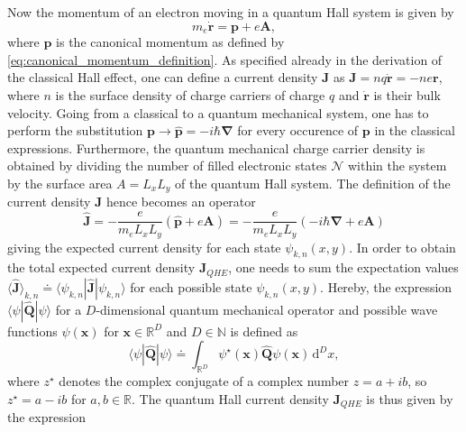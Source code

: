 \documentclass{report}
\numberwithin{tm}{section}
\newcommand\vect[1]{\ensuremath{\bm{#1}}}
\begin{document}
Now the momentum of an electron moving in a quantum Hall system is given by \begin{equation}
	m_e\dot{\vect{r}} = \vect{p} + e\vect{A},
\end{equation} where $\vect{p}$ is the canonical momentum as defined by \cref{eq:canonical_momentum_definition}. As specified already in the derivation of the classical Hall effect, one can define a current density $\vect{J}$ as $\vect{J} = nq\dot{\vect{r}} = -ne\vect{r}$, where $n$ is the surface density of charge carriers of charge $q$ and $\dot{\vect{r}}$ is their bulk velocity. Going from a classical to a quantum mechanical system, one has to perform the substitution $\vect{p} \rightarrow \hat{\vect{p}} = -i\hbar\vect{\nabla}$ for every occurence of $\vect{p}$ in the classical expressions. Furthermore, the quantum mechanical charge carrier density is obtained by dividing the number of filled electronic states $\mathcal{N}$ within the system by the surface area $A=L_xL_y$ of the quantum Hall system. The definition of the current density $\vect{J}$ hence becomes an operator \begin{equation}
\hat{\vect{J}} = -\frac{e}{m_eL_x L_y}\left(\hat{\vect{p}} + e\vect{A}\right) = -\frac{e}{m_eL_x L_y}\left(-i\hbar\vect{\nabla} + e\vect{A}\right)
\end{equation} giving the expected current density for each state $\psi_{k,n}(x,y)$. In order to obtain the total expected current density $\vect{J}_{QHE}$, one needs to sum the expectation values $\langle \hat{\vect{J}}\rangle_{k,n}\doteq \langle \psi_{k,n}|\hat{\vect{J}}|\psi_{k,n}\rangle$ for each possible state $\psi_{k,n}(x,y)$. Hereby, the expression $\langle \psi|\hat{\vect{Q}}|\psi\rangle$ for a $D$-dimensional quantum mechanical operator and possible wave functions $\psi(\vect{x})$ for $\vect{x}\in \mathbb{R}^D$ and $D \in \mathbb{N}$ is defined as \begin{equation}
\langle \psi|\hat{\vect{Q}}|\psi \rangle \doteq \int_{\mathbb{R}^D} \psi^\star(\vect{x})\hat{\vect{Q}}\psi(\vect{x})\,\mathrm{d}^D x,
\end{equation} where $z^\star$ denotes the complex conjugate of a complex number $z = a + ib$, so $z^\star = a-ib$ for $a,b \in \mathbb{R}$. The quantum Hall current density $\vect{J}_{QHE}$ is thus given by the expression
\end{document}

